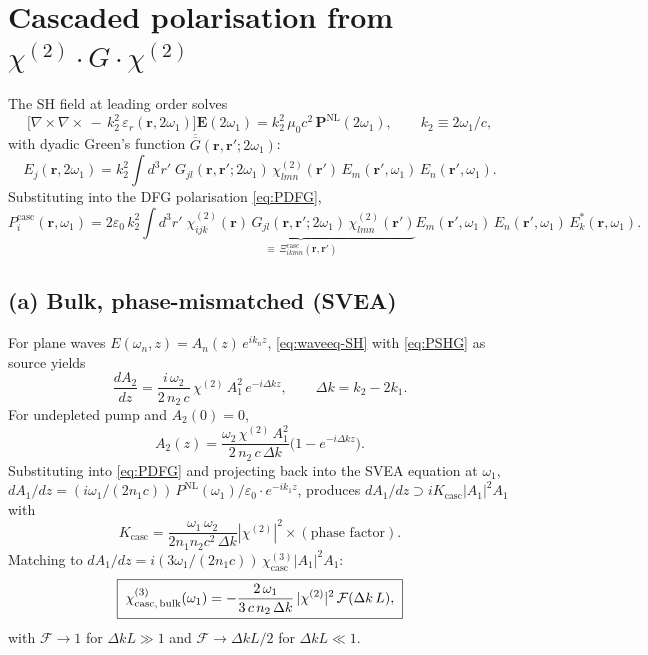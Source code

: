 \documentclass[11pt,a4paper]{article}
\newcommand{\eps}{\varepsilon}
\newcommand{\bvec}[1]{\mathbf{#1}}
\newcommand{\ri}{\bvec{r}}
\newcommand{\chitwo}{\chi^{(2)}}
\newcommand{\chithree}{\chi^{(3)}}
\begin{document}
\section{Cascaded polarisation from $\chitwo\!\cdot G\!\cdot\chitwo$}\label{sec:tensorder}

The SH field at leading order solves
\begin{equation}
  \bigl[\nabla\!\times\!\nabla\!\times\,-\,k_2^2\,\eps_r(\ri,2\omega_1)\bigr]
  \mathbf E(2\omega_1)=k_2^2\,\mu_0 c^2\,\mathbf P^{\text{NL}}(2\omega_1),
  \qquad k_2\equiv 2\omega_1/c,
\label{eq:waveeq-SH}
\end{equation}
with dyadic Green's function $\overline{\overline G}(\ri,\ri';2\omega_1)$:
\begin{equation}
  E_j(\ri,2\omega_1)
    = k_2^2\!\int\!d^3r'\;
      G_{jl}(\ri,\ri';2\omega_1)\,\chitwo_{lmn}(\ri')\,
      E_m(\ri',\omega_1)\,E_n(\ri',\omega_1).
  \label{eq:Esh-Green}
\end{equation}
Substituting into the DFG polarisation \eqref{eq:PDFG},
\begin{equation}
  P_i^{\text{casc}}(\ri,\omega_1)
  = 2\eps_0\,k_2^2\!\int\!d^3r'\;
    \underbrace{\chitwo_{ijk}(\ri)\,
                G_{jl}(\ri,\ri';2\omega_1)\,
                \chitwo_{lmn}(\ri')}_{\equiv\,\Xi^{\text{casc}}_{ikmn}(\ri,\ri')}
    E_m(\ri',\omega_1)\,E_n(\ri',\omega_1)\,E_k^*(\ri,\omega_1).
  \label{eq:Pcasc-nonlocal}
\end{equation}

\subsection*{(a) Bulk, phase-mismatched (SVEA)}
For plane waves $E(\omega_n,z)=A_n(z)\,e^{i k_n z}$, \eqref{eq:waveeq-SH} with \eqref{eq:PSHG} as source yields
\begin{equation}
  \frac{dA_2}{dz}=\frac{i\,\omega_2}{2\,n_2\,c}\,\chitwo\,A_1^{2}\,e^{-i\Delta k z},
  \qquad \Delta k=k_2-2k_1.
\end{equation}
For undepleted pump and $A_2(0)=0$,
\begin{equation}
  A_2(z)=\frac{\omega_2\,\chitwo\,A_1^{2}}{2\,n_2\,c\,\Delta k}\bigl(1-e^{-i\Delta k z}\bigr).
\end{equation}
Substituting into \eqref{eq:PDFG} and projecting back into the SVEA equation at $\omega_1$,
$dA_1/dz=(i\omega_1/(2 n_1 c))\,P^\text{NL}(\omega_1)/\eps_0\cdot e^{-i k_1 z}$, produces $dA_1/dz\supset iK_\text{casc}|A_1|^2 A_1$ with
\begin{equation*}
  K_\text{casc}=\frac{\omega_1\,\omega_2}{2 n_1 n_2 c^2\,\Delta k}|\chitwo|^2\times(\text{phase factor}).
\end{equation*}
Matching to $dA_1/dz=i(3\omega_1/(2n_1c))\,\chithree_\text{casc}|A_1|^2A_1$:
\begin{equation}
  \boxed{\;\chithree_{\text{casc,\,bulk}}(\omega_1)
        =-\frac{2\,\omega_1}{3\,c\,n_2\,\Delta k}\,|\chitwo|^{2}\,\mathcal{F}(\Delta k\,L),\;}
  \label{eq:chi3casc-bulk}
\end{equation}
with $\mathcal{F}\to 1$ for $\Delta k L\gg 1$ and $\mathcal{F}\to\Delta k L/2$ for $\Delta k L\ll 1$.
\end{document}
